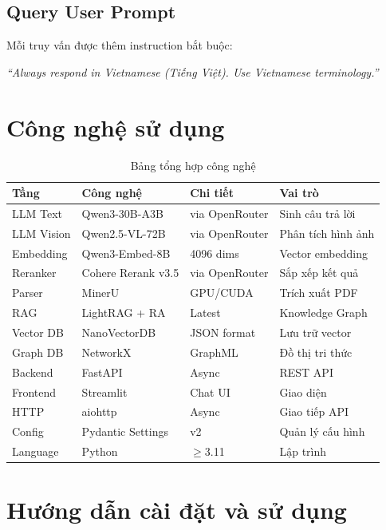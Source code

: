 \documentclass[12pt,a4paper]{article}
\begin{document}
\subsection{Query User Prompt}

Mỗi truy vấn được thêm instruction bắt buộc:

\textit{``Always respond in Vietnamese (Tiếng Việt). Use Vietnamese terminology.''}

\section{Công nghệ sử dụng}

\begin{table}[H]
\centering
\caption{Bảng tổng hợp công nghệ}
\begin{tabular}{p{2.5cm}p{4cm}p{3cm}p{3.5cm}}
\toprule
\textbf{Tầng} & \textbf{Công nghệ} & \textbf{Chi tiết} & \textbf{Vai trò} \\
\midrule
LLM Text & Qwen3-30B-A3B & via OpenRouter & Sinh câu trả lời \\
LLM Vision & Qwen2.5-VL-72B & via OpenRouter & Phân tích hình ảnh \\
Embedding & Qwen3-Embed-8B & 4096 dims & Vector embedding \\
Reranker & Cohere Rerank v3.5 & via OpenRouter & Sắp xếp kết quả \\
Parser & MinerU & GPU/CUDA & Trích xuất PDF \\
RAG & LightRAG + RA & Latest & Knowledge Graph \\
Vector DB & NanoVectorDB & JSON format & Lưu trữ vector \\
Graph DB & NetworkX & GraphML & Đồ thị tri thức \\
Backend & FastAPI & Async & REST API \\
Frontend & Streamlit & Chat UI & Giao diện \\
HTTP & aiohttp & Async & Giao tiếp API \\
Config & Pydantic Settings & v2 & Quản lý cấu hình \\
Language & Python & $\geq$3.11 & Lập trình \\
\bottomrule
\end{tabular}
\end{table}

\section{Hướng dẫn cài đặt và sử dụng}
\end{document}
